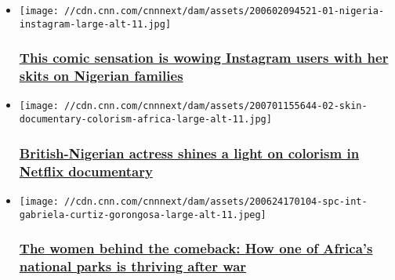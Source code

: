 \begin{itemize}
\item
  \href{/2020/07/10/africa/nigeria-instagram-comic-intl/index.html}{}

  \texttt{[image: //cdn.cnn.com/cnnnext/dam/assets/200602094521-01-nigeria-instagram-large-alt-11.jpg]}

  \hypertarget{this-comic-sensation-is-wowing-instagram-users-with-her-skits-on-nigerian-families}{%
  \subsubsection{\texorpdfstring{\href{/2020/07/10/africa/nigeria-instagram-comic-intl/index.html}{This
  comic sensation is wowing Instagram users with her skits on Nigerian
  families}}{This comic sensation is wowing Instagram users with her skits on Nigerian families}}\label{this-comic-sensation-is-wowing-instagram-users-with-her-skits-on-nigerian-families}}
\end{itemize}

\begin{itemize}
\item
  \href{/2020/07/03/africa/colorism-documentary-africa/index.html}{}

  \texttt{[image: //cdn.cnn.com/cnnnext/dam/assets/200701155644-02-skin-documentary-colorism-africa-large-alt-11.jpg]}

  \hypertarget{british-nigerian-actress-shines-a-light-on-colorism-in-netflix-documentary}{%
  \subsubsection{\texorpdfstring{\href{/2020/07/03/africa/colorism-documentary-africa/index.html}{British-Nigerian
  actress shines a light on colorism in Netflix
  documentary}}{British-Nigerian actress shines a light on colorism in Netflix documentary}}\label{british-nigerian-actress-shines-a-light-on-colorism-in-netflix-documentary}}
\end{itemize}

\begin{itemize}
\item
  \href{/travel/article/inside-africa-gorongosa-national-park-spc-intl/index.html}{}

  \texttt{[image: //cdn.cnn.com/cnnnext/dam/assets/200624170104-spc-int-gabriela-curtiz-gorongosa-large-alt-11.jpeg]}

  \hypertarget{the-women-behind-the-comeback-how-one-of-africas-national-parks-is-thriving-after-war}{%
  \subsubsection{\texorpdfstring{\href{/travel/article/inside-africa-gorongosa-national-park-spc-intl/index.html}{The
  women behind the comeback: How one of Africa's national parks is
  thriving after
  war}}{The women behind the comeback: How one of Africa's national parks is thriving after war}}\label{the-women-behind-the-comeback-how-one-of-africas-national-parks-is-thriving-after-war}}
\end{itemize}


